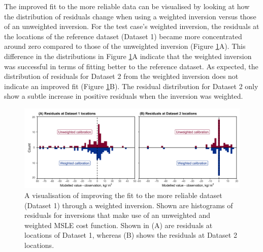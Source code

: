 The improved fit to the more reliable data can be visualised by looking at how the distribution of residuals change when using a weighted inversion versus those of an unweighted inversion. For the test case's weighted inversion, the residuals at the locations of the reference dataset (Dataset 1) became more concentrated around zero compared to those of the unweighted inversion (Figure \ref{fig:histvaruncert}A). This difference in the distributions in Figure \ref{fig:histvaruncert}A indicate that the weighted inversion was successful in terms of fitting better to the reference dataset. As expected, the distribution of residuals for Dataset 2 from the weighted inversion does not indicate an improved fit (Figure \ref{fig:histvaruncert}B). The residual distribution for Dataset 2 only show a subtle increase in positive residuals when the inversion was weighted.

    \begin{figure}[htbp!]
    \centering
    \includegraphics[width=\linewidth]{Figures/fig6_histograms-weighting.png}
    \caption{A visualisation of improving the fit to the more reliable dataset (Dataset 1) through a weighted inversion. Shown are histograms of residuals for inversions that make use of an unweighted and weighted MSLE cost function. Shown in (A) are residuals at locations of Dataset 1, whereas (B) shows the residuals at Dataset 2 locations.}
    \label{fig:histvaruncert}
    \end{figure}

